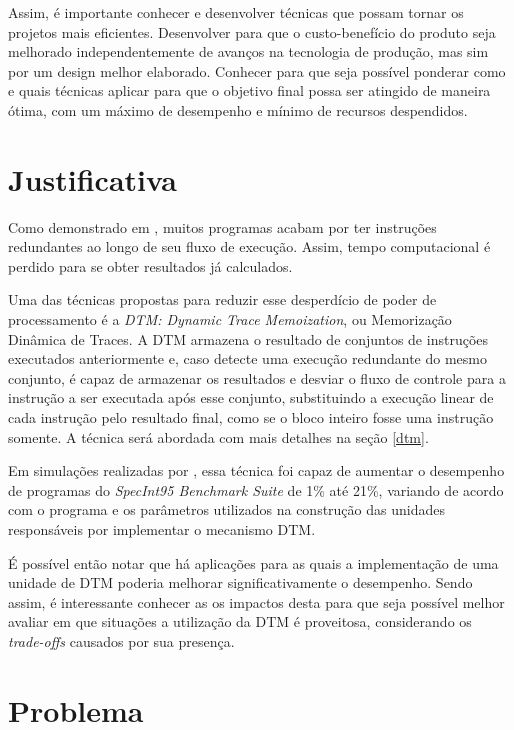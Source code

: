 Assim, é importante conhecer e desenvolver técnicas que possam tornar os projetos mais eficientes. Desenvolver para que o custo-benefício do produto seja melhorado independentemente de avanços na tecnologia de produção, mas sim por um design melhor elaborado. Conhecer para que seja possível ponderar como e quais técnicas aplicar para que o objetivo final possa ser atingido de maneira ótima, com um máximo de desempenho e mínimo de recursos despendidos.



\section{Justificativa} %

Como demonstrado em \cite{costa2001explorando}, muitos programas acabam por ter instruções redundantes ao longo de seu fluxo de execução. Assim, tempo computacional é perdido para se obter resultados já calculados.

Uma das técnicas propostas para reduzir esse desperdício de poder de processamento é a \textit{DTM: Dynamic Trace Memoization}, ou Memorização Dinâmica de Traces. A DTM armazena o resultado de conjuntos de instruções executados anteriormente e, caso detecte uma execução redundante do mesmo conjunto, é capaz de armazenar os resultados e desviar o fluxo de controle para a instrução a ser executada após esse conjunto, substituindo a execução linear de cada instrução pelo resultado final, como se o bloco inteiro fosse uma instrução somente. A técnica será abordada com mais detalhes na seção \ref{dtm}.

Em simulações realizadas por \cite{costa2001explorando}, essa técnica foi capaz de aumentar o desempenho de programas do \textit{SpecInt95 Benchmark Suite} de 1\% até 21\%, variando de acordo com o programa e os parâmetros utilizados na construção das unidades responsáveis por implementar o mecanismo DTM.

É possível então notar que há aplicações para as quais a implementação de uma unidade de DTM poderia melhorar significativamente o desempenho. Sendo assim, é interessante conhecer as os impactos desta para que seja possível melhor avaliar em que situações a utilização da DTM é proveitosa, considerando os \textit{trade-offs} causados por sua presença.

\section{Problema}

